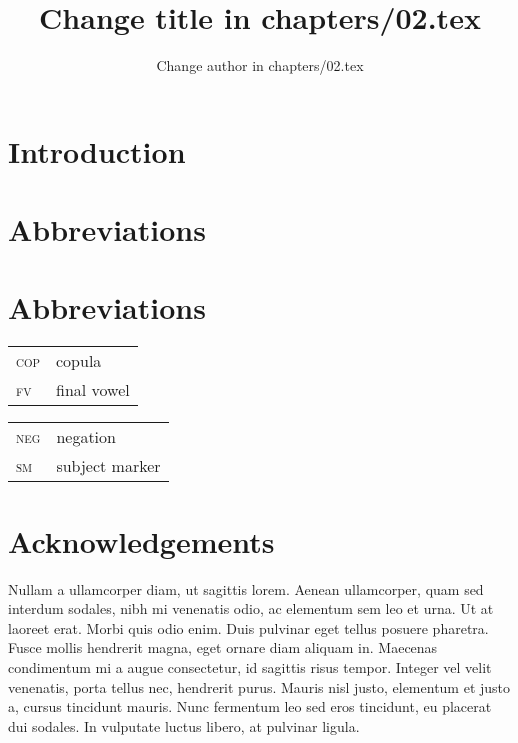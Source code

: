\documentclass[output=paper]{langsci/langscibook}
\author{Change author in chapters/02.tex}
\title{Change title in chapters/02.tex}
\begin{document}
\section{Introduction}



\section*{Abbreviations}

\section*{Abbreviations}
\begin{tabularx}{.45\textwidth}{lX}
\textsc{cop} & copula\\ 
\textsc{fv} & final vowel\\
\end{tabularx}
\begin{tabularx}{.45\textwidth}{lX}
\textsc{neg} & negation\\ 
\textsc{sm} & subject marker\\
\end{tabularx}

\section*{Acknowledgements}
Nullam a ullamcorper diam, ut sagittis lorem. Aenean ullamcorper, quam sed interdum sodales, nibh mi venenatis odio, ac elementum sem leo et urna. Ut at laoreet erat. Morbi quis odio enim. Duis pulvinar eget tellus posuere pharetra. Fusce mollis hendrerit magna, eget ornare diam aliquam in. Maecenas condimentum mi a augue consectetur, id sagittis risus tempor. Integer vel velit venenatis, porta tellus nec, hendrerit purus. Mauris nisl justo, elementum et justo a, cursus tincidunt mauris. Nunc fermentum leo sed eros tincidunt, eu placerat dui sodales. In vulputate luctus libero, at pulvinar ligula. 

{\sloppy
\printbibliography[heading=subbibliography,notkeyword=this]
}
\end{document}
